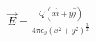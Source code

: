 \documentclass[preview]{standalone}
\begin{document}
\begin{align*}
\vec{E}=\frac{Q\left ( x\hat{i}+y\hat{j} \right )}{4\pi\epsilon_{0}\left ( x^{2}+y^{2} \right )^{\frac{3}{2}}}
\end{align*}
\end{document}
